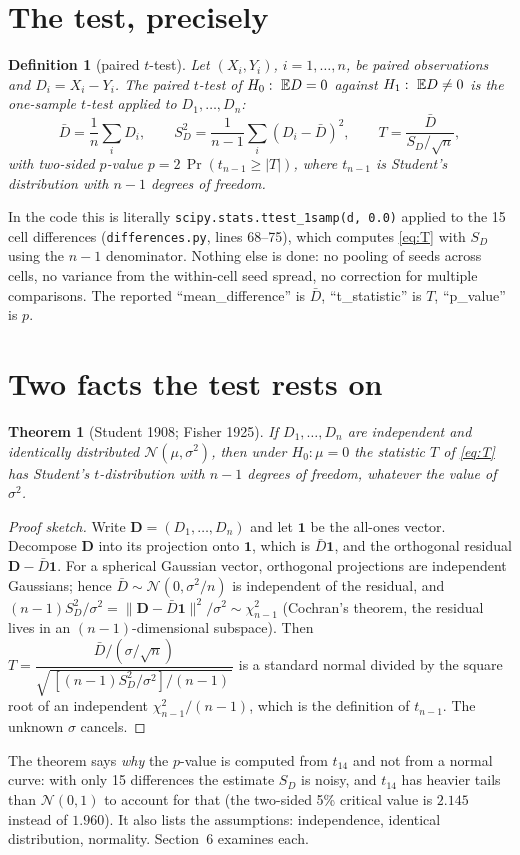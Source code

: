 \documentclass[11pt,a4paper]{article}
\newtheorem{definition}{Definition}\newtheorem{lemma}{Lemma}\newtheorem{proposition}{Proposition}\newtheorem{theorem}{Theorem}\newtheorem{remark}{Remark}
\begin{document}
\section{The test, precisely}
\begin{definition}[paired $t$-test]
Let $(X_i,Y_i)$, $i=1,\dots,n$, be paired observations and $D_i=X_i-Y_i$. The paired $t$-test of $H_0:\ \mathbb E D=0$ against $H_1:\ \mathbb E D\neq0$ is the one-sample $t$-test applied to $D_1,\dots,D_n$:
\begin{equation}
\bar D=\frac1n\sum_i D_i,\qquad S_D^2=\frac1{n-1}\sum_i(D_i-\bar D)^2,\qquad T=\frac{\bar D}{S_D/\sqrt n},
\label{eq:T}
\end{equation}
with two-sided $p$-value $p=2\,\Pr(t_{n-1}\ge|T|)$, where $t_{n-1}$ is Student's distribution with $n-1$ degrees of freedom.
\end{definition}
In the code this is literally \texttt{scipy.stats.ttest\_1samp(d, 0.0)} applied to the 15 cell differences (\texttt{differences.py}, lines 68--75), which computes \eqref{eq:T} with $S_D$ using the $n-1$ denominator. Nothing else is done: no pooling of seeds across cells, no variance from the within-cell seed spread, no correction for multiple comparisons. The reported ``mean\_difference'' is $\bar D$, ``t\_statistic'' is $T$, ``p\_value'' is $p$.

\section{Two facts the test rests on}
\begin{theorem}[Student 1908; Fisher 1925]\label{thm:t}
If $D_1,\dots,D_n$ are independent and identically distributed $\mathcal N(\mu,\sigma^2)$, then under $H_0:\mu=0$ the statistic $T$ of \eqref{eq:T} has Student's $t$-distribution with $n-1$ degrees of freedom, whatever the value of $\sigma^2$.
\end{theorem}
\begin{proof}[Proof sketch]
Write $\bm D=(D_1,\dots,D_n)$ and let $\bm 1$ be the all-ones vector. Decompose $\bm D$ into its projection onto $\bm 1$, which is $\bar D\bm 1$, and the orthogonal residual $\bm D-\bar D\bm1$. For a spherical Gaussian vector, orthogonal projections are independent Gaussians; hence $\bar D\sim\mathcal N(0,\sigma^2/n)$ is independent of the residual, and $(n-1)S_D^2/\sigma^2=\|\bm D-\bar D\bm1\|^2/\sigma^2\sim\chi^2_{n-1}$ (Cochran's theorem, the residual lives in an $(n-1)$-dimensional subspace). Then
$T=\dfrac{\bar D/(\sigma/\sqrt n)}{\sqrt{\,[(n-1)S_D^2/\sigma^2]/(n-1)\,}}$ is a standard normal divided by the square root of an independent $\chi^2_{n-1}/(n-1)$, which is the definition of $t_{n-1}$. The unknown $\sigma$ cancels.
\end{proof}
The theorem says \emph{why} the $p$-value is computed from $t_{14}$ and not from a normal curve: with only 15 differences the estimate $S_D$ is noisy, and $t_{14}$ has heavier tails than $\mathcal N(0,1)$ to account for that (the two-sided 5\% critical value is $2.145$ instead of $1.960$). It also lists the assumptions: independence, identical distribution, normality. Section~6 examines each.
\end{document}
